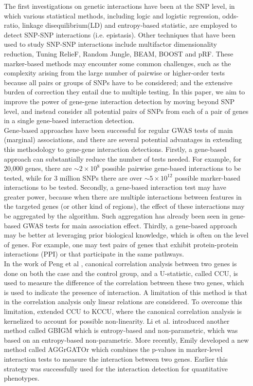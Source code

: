 \documentclass[11pt]{article}
\theoremstyle{plain}
\theoremstyle{definition}
\theoremstyle{remark}
\begin{document}
\noindent The first investigations on genetic interactions have been at the SNP level, in which various statistical methods, including logic and logistic regression, odds-ratio, linkage disequilibrium(LD) and entropy-based statistic, are employed to detect SNP-SNP interactions (i.e. epistasis). Other techniques that have been used to study SNP-SNP interactions include multifactor dimensionality reduction, Tuning RelieF, Random Jungle, BEAM, BOOST\cite{1} and pRF\cite{2}. These marker-based methods may encounter some common challenges, such as the complexity arising from the large number of pairwise or higher-order tests because all pairs or groups of SNPs have to be considered; and the extensive burden of correction they entail due to multiple testing. In this paper, we aim to improve the power of gene-gene interaction detection by moving beyond SNP level, and instead consider all potential pairs of SNPs from each of a pair of genes in a single gene-based interaction detection.\\

\noindent Gene-based approaches have been successful for regular GWAS tests of main (marginal) associations, and there are several potential advantages in extending this methodology to gene-gene interaction detections. Firstly, a gene-based approach can substantially reduce the number of tests needed. For example, for 20,000 genes, there are $\sim 2\times 10^8$ possible pairwise gene-based interactions to be tested, while for 3 million SNPs there are over $\sim 5\times 10^{12}$ possible marker-based interactions to be tested. Secondly, a gene-based interaction test may have greater power, because when there are multiple interactions between features in the targeted genes (or other kind of regions), the effect of these interactions may be aggregated by the algorithm. Such aggregation has already been seen in gene-based GWAS tests for main association effect. Thirdly, a gene-based approach may be better at leveraging prior biological knowledge, which is often on the level of genes. For example, one may test pairs of genes that exhibit protein-protein interactions (PPI) or that participate in the same pathways.\\

\noindent In the work of Peng et al \cite{3}, canonical correlation analysis between two genes is done on both the case and the control group, and a U-statistic, called CCU, is used to measure the difference of the correlation between these two genes, which is used to indicate the presence of interaction. A limitation of this method is that in the correlation analysis only linear relations are considered. To overcome this limitation, \cite{4,5} extended CCU to KCCU, where the canonical correlation analysis is kernelized to account for possible non-linearity. Li et al. \cite{6} introduced another method called GBIGM which is entropy-based and non-parametric, which was based on an entropy-based non-parametric. More recently, Emily \cite{7} developed a new method called AGGrGATOr which combines the p-values in marker-level interaction tests to measure the interaction between two genes. Earlier\cite{8} this strategy was successfully used for the interaction detection for quantitative phenotypes.\\
\end{document}
